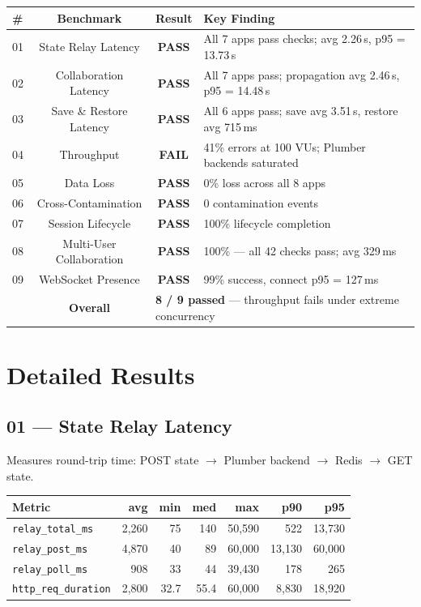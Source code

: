 \documentclass[11pt,a4paper]{article}
\newcommand{\pass}{\textcolor{pass}{\textbf{PASS}}}
\newcommand{\fail}{\textcolor{fail}{\textbf{FAIL}}}
\begin{document}
\begin{tabularx}{\textwidth}{@{}lccX@{}}
\toprule
\textbf{\#} & \textbf{Benchmark} & \textbf{Result} & \textbf{Key Finding} \\
\midrule
01 & State Relay Latency       & \pass & All 7 apps pass checks; avg 2.26\,s, p95 = 13.73\,s \\
02 & Collaboration Latency     & \pass & All 7 apps pass; propagation avg 2.46\,s, p95 = 14.48\,s \\
03 & Save \& Restore Latency   & \pass & All 6 apps pass; save avg 3.51\,s, restore avg 715\,ms \\
04 & Throughput                 & \fail & 41\% errors at 100 VUs; Plumber backends saturated \\
05 & Data Loss                 & \pass & 0\% loss across all 8 apps \\
06 & Cross-Contamination       & \pass & 0 contamination events \\
07 & Session Lifecycle          & \pass & 100\% lifecycle completion \\
08 & Multi-User Collaboration   & \pass & 100\% — all 42 checks pass; avg 329\,ms \\
09 & WebSocket Presence         & \pass & 99\% success, connect p95 = 127\,ms \\
\midrule
   & \textbf{Overall}          & \multicolumn{2}{l}{\textbf{8 / 9 passed} — throughput fails under extreme concurrency} \\
\bottomrule
\end{tabularx}

\section{Detailed Results}

\subsection{01 — State Relay Latency}

Measures round-trip time: POST state $\to$ Plumber backend $\to$ Redis $\to$ GET state.

\begin{tabular}{@{}lrrrrrr@{}}
\toprule
\textbf{Metric} & \textbf{avg} & \textbf{min} & \textbf{med} & \textbf{max} & \textbf{p90} & \textbf{p95} \\
\midrule
\texttt{relay\_total\_ms}  & 2,260  & 75    & 140   & 50,590 & 522    & 13,730 \\
\texttt{relay\_post\_ms}   & 4,870  & 40    & 89    & 60,000 & 13,130 & 60,000 \\
\texttt{relay\_poll\_ms}   & 908    & 33    & 44    & 39,430 & 178    & 265    \\
\texttt{http\_req\_duration} & 2,800 & 32.7  & 55.4  & 60,000 & 8,830  & 18,920 \\
\bottomrule
\end{tabular}
\end{document}
